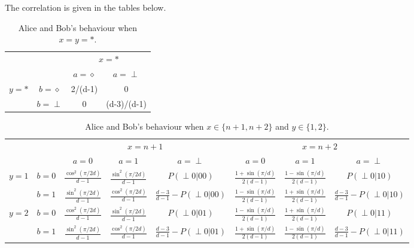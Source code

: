 \documentclass[11pt,letterpaper]{article}
\newcommand{\1}{\mathbb{1}}
\newcommand{\pr}[2]{P(#1|#2)}
\theoremstyle{definition}
\begin{document}
The correlation is given in the tables below.
\begin{table}[H]
\begin{center}
\begin{tabular}{|c|c||c|c|}
\hline
\multicolumn{2}{|c|}{} &
\multicolumn{2}{|c|}{$x=\ast$}\\
\cline{3-4}
\multicolumn{2}{|c|}{} &$a = \diamond$ & $a = \perp$ \\
\hline
\hline
\multirow{2}{*}{$y = \ast$} & $b=\diamond$ & 2/(d-1) & 0 \\
\cline{2-4}
&$b=\perp$ & 0 & (d-3)/(d-1) \\
\hline
\end{tabular}
\caption{Alice and Bob's behaviour when $x=y=\ast$.}
\end{center}
\end{table}

\begin{table}[H]
\begin{center}
\begin{tabular}{|c|c||c|c|c|c|c|c|}
\hline
\multicolumn{2}{|c|}{} &
\multicolumn{3}{|c|}{$x=n+1$}&
\multicolumn{3}{|c|}{$x=n+2$} \\
\cline{3-8}
\multicolumn{2}{|c|}{} &
$a = 0$ & $a=1$ & $a=\perp$ &
$a = 0$ & $a=1$ & $a=\perp$\\
\hline
\hline
\multirow{2}{*}{$y = 1$} & $b=0$ & $\frac{\cos^2(\pi/2d)}{d-1}$ & $\frac{\sin^2(\pi/2d)}{d-1}$ & \small $\pr{\perp0}{00}$ 
& $\frac{1+\sin(\pi/d)}{2(d-1)}$ & $\frac{1-\sin(\pi/d)}{2(d-1)}$ & \small  $\pr{\perp0}{10}$ \\
\cline{2-8}
&$b=1$ & $\frac{\sin^2(\pi/2d)}{d-1}$ & $\frac{\cos^2(\pi/2d)}{d-1}$ & $\frac{d-3}{d-1}-\pr{\perp0}{00}$ 
&  $\frac{1-\sin(\pi/d)}{2(d-1)}$ & $\frac{1+\sin(\pi/d)}{2(d-1)}$ & \small $\frac{d-3}{d-1} - \pr{\perp0}{10}$  \\
\hline
\multirow{2}{*}{$y = 2$} & $b=0$ & $\frac{\cos^2(\pi/2d)}{d-1}$ & $\frac{\sin^2(\pi/2d)}{d-1}$ & \small $\pr{\perp0}{01}$ & 
$ \frac{1-\sin(\pi/d)}{2(d-1)}$ & $ \frac{1+\sin(\pi/d)}{2(d-1)}$ & \small $\pr{\perp 0}{11}$  \\
\cline{2-8}
&$b=1$ & $\frac{\sin^2(\pi/2d)}{d-1}$ & $\frac{\cos^2(\pi/2d)}{d-1}$ & \small $\frac{d-3}{d-1}-\pr{\perp0}{01}$ &  
$ \frac{1+\sin(\pi/d)}{2(d-1)}$ & $ \frac{1-\sin(\pi/d)}{2(d-1)}$ & \small $\frac{d-3}{d-1}- \pr{\perp 0}{11}$ \\
\hline
\end{tabular}
\end{center}
\caption{Alice and Bob's behaviour when $x \in \{n+1, n+2\}$ and $y \in \{1,2\}$.}
\label{tb:chsh}
\end{table}
\end{document}
